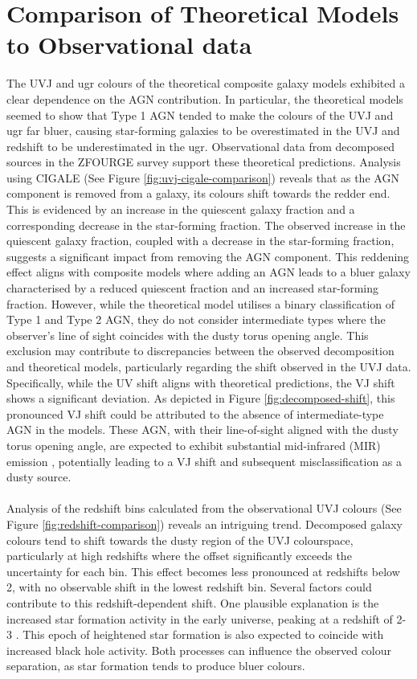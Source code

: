 \section{Comparison of Theoretical Models to Observational data}
The UVJ and ugr colours of the theoretical composite galaxy models exhibited a clear dependence on the AGN contribution. In particular, the theoretical models seemed to show that Type 1 AGN tended to make the colours of the UVJ and ugr far bluer, causing star-forming galaxies to be overestimated in the UVJ and redshift to be underestimated in the ugr. Observational data from decomposed sources in the ZFOURGE survey support these theoretical predictions.  Analysis using CIGALE (See Figure \ref{fig:uvj-cigale-comparison}) reveals that as the AGN component is removed from a galaxy, its colours shift towards the redder end. This is evidenced by an increase in the quiescent galaxy fraction and a corresponding decrease in the star-forming fraction. 
The observed increase in the quiescent galaxy fraction, coupled with a decrease in the star-forming fraction, suggests a significant impact from removing the AGN component. This reddening effect aligns with composite models where adding an AGN leads to a bluer galaxy characterised by a reduced quiescent fraction and an increased star-forming fraction. However, while the theoretical model utilises a binary classification of Type 1 and Type 2 AGN, they do not consider intermediate types where the observer's line of sight coincides with the dusty torus opening angle. This exclusion may contribute to discrepancies between the observed decomposition and theoretical models, particularly regarding the shift observed in the UVJ data. Specifically, while the UV shift aligns with theoretical predictions, the VJ shift shows a significant deviation.  As depicted in Figure \ref{fig:decomposed-shift}, this pronounced VJ shift could be attributed to the absence of intermediate-type AGN in the models.  These AGN, with their line-of-sight aligned with the dusty torus opening angle, are expected to exhibit substantial mid-infrared (MIR) emission \citep{ciesla_constraining_2015}, potentially leading to a VJ shift and subsequent misclassification as a dusty source. \\\\
Analysis of the redshift bins calculated from the observational UVJ colours (See Figure \ref{fig:redshift-comparison}) reveals an intriguing trend. Decomposed galaxy colours tend to shift towards the dusty region of the UVJ colourspace, particularly at high redshifts where the offset significantly exceeds the uncertainty for each bin. This effect becomes less pronounced at redshifts below 2, with no observable shift in the lowest redshift bin. Several factors could contribute to this redshift-dependent shift. One plausible explanation is the increased star formation activity in the early universe, peaking at a redshift of 2-3 \citep{madau_cosmic_2014}. This epoch of heightened star formation is also expected to coincide with increased black hole activity. Both processes can influence the observed colour separation, as star formation tends to produce bluer colours.
